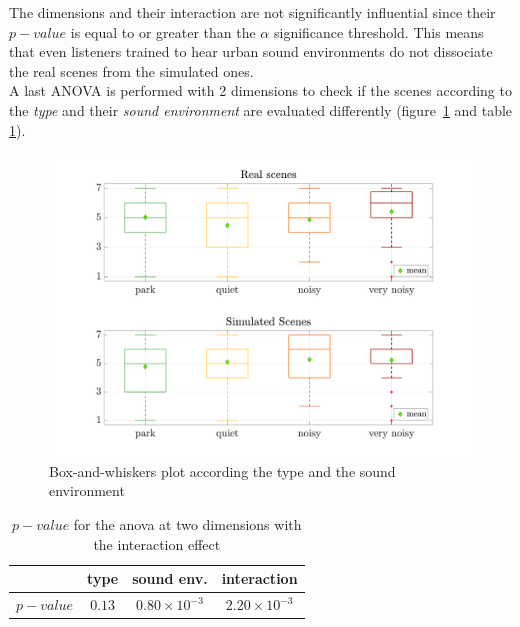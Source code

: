 \documentclass[a4,11pt,twocolumn]{article}
\begin{document}
The dimensions and their interaction are not significantly influential since their $ p-value $ is equal to or greater than the $ \alpha$ significance threshold. This means that even listeners trained to hear urban sound environments do not dissociate the real scenes from the simulated ones.\\

A last ANOVA is performed with 2 dimensions to check if the scenes according to the \textit{type} and their \textit{sound environment} are evaluated differently (figure~\ref{fig:boxplot_type_ambience} and table \ref{tab:p_value_type_ambience}).

\begin{figure}[h]
\centering
\includegraphics[width=\linewidth]{./pictures/testPerceptif_boxplotAmbianceCOLOR_EN.pdf}
\caption{Box-and-whiskers plot according the type and the sound environment}
\label{fig:boxplot_type_ambience}
\end{figure}

\begin{table}[h]
\centering
\begin{tabular}{cccc}
\cline{2-4}
          & type   & sound env. & interaction \\
\hline
$p-value$ & $0.13$ & $0.80 \times 10^{-3}$     & $2.20 \times 10^{-3}$ \\
\hline
\end{tabular}
\caption{$p-value$ for the anova at two dimensions with the interaction effect}
\label{tab:p_value_type_ambience}
\end{table}
\end{document}
